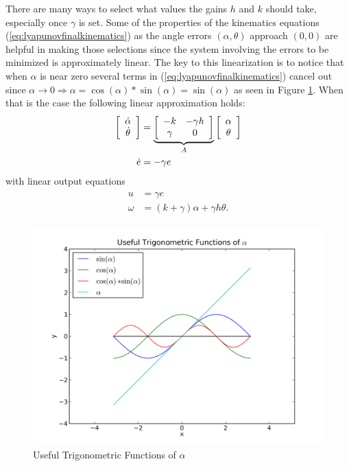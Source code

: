 There are many ways to select what values the gains $h$ and $k$ should take, especially once $\gamma$ is set. Some of the properties of the kinematics equations (\ref{eq:lyapunovfinalkinematics}) as the angle errors $(\alpha, \theta)$ approach $(0, 0)$ are helpful in making those selections since the system involving the errors to be minimized is approximately linear. The key to this linearization is to notice that when $\alpha$ is near zero several terms in (\ref{eq:lyapunovfinalkinematics}) cancel out since $\alpha\to0\Rightarrow \alpha=\cos(\alpha)*\sin(\alpha)=\sin(\alpha)$ as seen in Figure \ref{fig:plotSinCos}. When that is the case the following linear approximation holds:
\begin{align}
\label{eq:lyapunovLinearSystem}
\begin{split}
\left[\begin{array}{c} \dot{\alpha} \\ \dot{\theta} \end{array}\right]
&= \underbrace{\left[\begin{array}{c c} -k & -\gamma h \\ \gamma & 0 \end{array}\right]}_{A}
\left[\begin{array}{c} \alpha \\ \theta \end{array}\right] \\
\dot{e} &= -\gamma e
\end{split}
\end{align}
with linear output equations
\begin{align}
\label{eq:lyapunovLinearOutput}
\begin{split}
u &= \gamma e \\
\omega &= (k+\gamma)\alpha + \gamma h\theta.
\end{split}
\end{align}

\begin{figure}[ht!]
	\centering
	\includegraphics[width=.75\textwidth]{images/plotSinCos}
	\caption{Useful Trigonometric Functions of $\alpha$}
	\label{fig:plotSinCos}
\end{figure}

